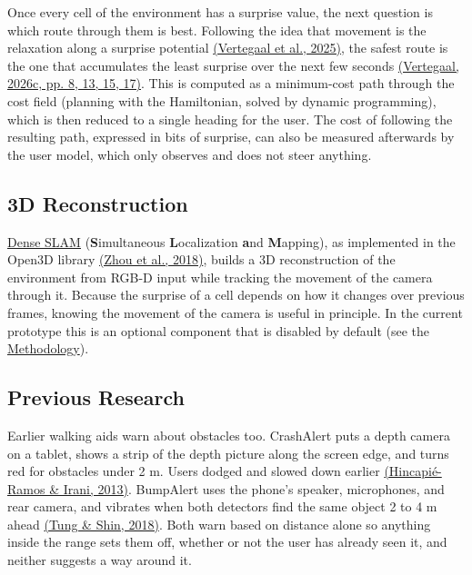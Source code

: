 \documentclass[a4paper]{article}
\begin{document}
Once every cell of the environment has a surprise value, the next question is which route through them is best. Following the idea that movement is the relaxation along a surprise potential \hyperref[references]{(Vertegaal et al., 2025)}, the safest route is the one that accumulates the least surprise over the next few seconds \hyperref[references]{(Vertegaal, 2026c, pp. 8, 13, 15, 17)}. This is computed as a minimum-cost path through the cost field (planning with the Hamiltonian, solved by dynamic programming), which is then reduced to a single heading for the user. The cost of following the resulting path, expressed in bits of surprise, can also be measured afterwards by the user model, which only observes and does not steer anything.

\subsection{3D Reconstruction} \label{3d-reconstruction}

\href{https://www.open3d.org/html/tutorial/t\_reconstruction\_system/dense\_slam.html}{Dense SLAM} (\textbf{S}imultaneous \textbf{L}ocalization \textbf{a}nd \textbf{M}apping), as implemented in the Open3D library \hyperref[references]{(Zhou et al., 2018)}, builds a 3D reconstruction of the environment from RGB-D input while tracking the movement of the camera through it. Because the surprise of a cell depends on how it changes over previous frames, knowing the movement of the camera is useful in principle. In the current prototype this is an optional component that is disabled by default (see the \hyperref[methodology]{Methodology}).

\subsection{Previous Research} \label{previous-research}

Earlier walking aids warn about obstacles too. CrashAlert puts a depth camera on a tablet, shows a strip of the depth picture along the screen edge, and turns red for obstacles under 2 m. Users dodged and slowed down earlier \hyperref[references]{(Hincapié-Ramos \& Irani, 2013)}. BumpAlert uses the phone's speaker, microphones, and rear camera, and vibrates when both detectors find the same object 2 to 4 m ahead \hyperref[references]{(Tung \& Shin, 2018)}. Both warn based on distance alone so anything inside the range sets them off, whether or not the user has already seen it, and neither suggests a way around it.
\end{document}
